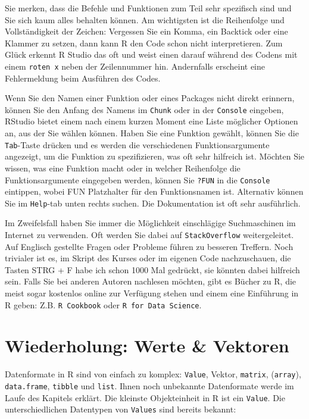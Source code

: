 \documentclass[
  ngerman,
]{book}
\begin{document}
Sie merken, dass die Befehle und Funktionen zum Teil sehr spezifisch sind und Sie sich kaum alles behalten können. Am wichtigsten ist die Reihenfolge und Vollständigkeit der Zeichen: Vergessen Sie ein Komma, ein Backtick oder eine Klammer zu setzen, dann kann R den Code schon nicht interpretieren. Zum Glück erkennt R Studio das oft und weist einen darauf während des Codens mit einem \texttt{roten\ x} neben der Zeilennummer hin. Andernfalls erscheint eine Fehlermeldung beim Ausführen des Codes.

Wenn Sie den Namen einer Funktion oder eines Packages nicht direkt erinnern, können Sie den Anfang des Namens im \texttt{Chunk} oder in der \texttt{Console} eingeben, RStudio bietet einem nach einem kurzen Moment eine Liste möglicher Optionen an, aus der Sie wählen können. Haben Sie eine Funktion gewählt, können Sie die \texttt{Tab}-Taste drücken und es werden die verschiedenen Funktionsargumente angezeigt, um die Funktion zu spezifizieren, was oft sehr hilfreich ist. Möchten Sie wissen, was eine Funktion macht oder in welcher Reihenfolge die Funktionsargumente eingegeben werden, können Sie \texttt{?FUN} in die \texttt{Console} eintippen, wobei FUN Platzhalter für den Funktionsnamen ist. Alternativ können Sie im \texttt{Help}-tab unten rechts suchen. Die Dokumentation ist oft sehr ausführlich.

Im Zweifelsfall haben Sie immer die Möglichkeit einschlägige Suchmaschinen im Internet zu verwenden. Oft werden Sie dabei auf \texttt{StackOverflow} weitergeleitet. Auf Englisch gestellte Fragen oder Probleme führen zu besseren Treffern. Noch trivialer ist es, im Skript des Kurses oder im eigenen Code nachzuschauen, die Tasten STRG + F habe ich schon 1000 Mal gedrückt, sie könnten dabei hilfreich sein. Falls Sie bei anderen Autoren nachlesen möchten, gibt es Bücher zu R, die meist sogar kostenlos online zur Verfügung stehen und einem eine Einführung in R geben: Z.B. \texttt{R\ Cookbook} oder \texttt{R\ for\ Data\ Science}.

\section{Wiederholung: Werte \& Vektoren}\label{wiederholung-werte-vektoren}

Datenformate in R sind von einfach zu komplex: \texttt{Value}, Vektor, \texttt{matrix}, (\texttt{array}), \texttt{data.frame}, \texttt{tibble} und \texttt{list}. Ihnen noch unbekannte Datenformate werde im Laufe des Kapitels erklärt.
Die kleinste Objekteinheit in R ist ein \texttt{Value}. Die unterschiedlichen Datentypen von \texttt{Values} sind bereits bekannt:
\end{document}
